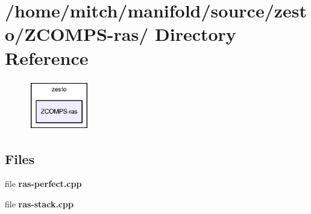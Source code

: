 \section{/home/mitch/manifold/source/zesto/ZCOMPS-ras/ Directory Reference}
\label{dir_e5828fe8f3c7b216576d001824dd8cf1}


\nopagebreak
\begin{figure}[H]
\begin{center}
\leavevmode
\includegraphics[width=75pt]{dir_e5828fe8f3c7b216576d001824dd8cf1_dep}
\end{center}
\end{figure}
\subsection*{Files}
\begin{CompactItemize}
\item 
file {\bf ras-perfect.cpp}
\item 
file {\bf ras-stack.cpp}
\end{CompactItemize}
